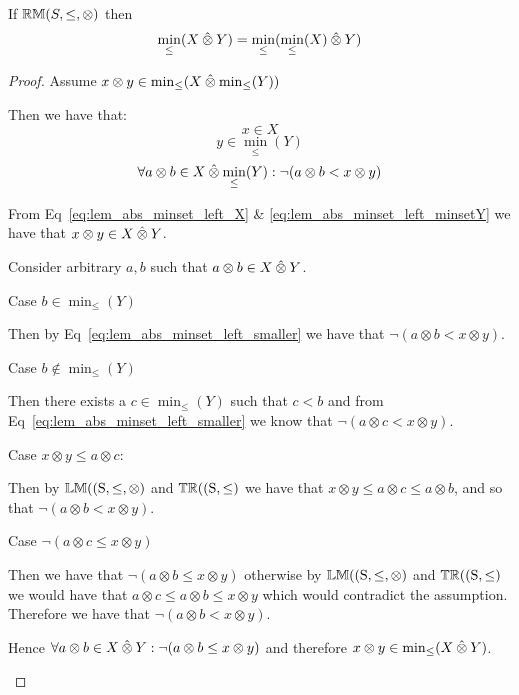 \begin{lemma} \label{lem:minlift_left_absorption}
If ${\mathbb{RM}}(S,\leq,\otimes)$ then
\begin{equation*}
\min_\leq(X \mathbin{\hat{\otimes}} Y) = \min_\leq(\min_\leq(X) \mathbin{\hat{\otimes}} Y)
\end{equation*}
\end{lemma}

\begin{proof}

\vspace{0.5em}
Assume $x \otimes y \in \min_\leq(X \mathbin{\hat{\otimes}} \min_\leq(Y))$

\begin{ind}
Then we have that:
\begin{equation} \label{eq:lem_abs_minset_left_X}
x \in X
\end{equation}
\begin{equation} \label{eq:lem_abs_minset_left_minsetY}
y \in \min_\leq(Y)
\end{equation}
\begin{equation} \label{eq:lem_abs_minset_left_smaller}
\forall a \otimes b \in X \mathbin{\hat{\otimes}} \min_\leq(Y) : \neg (a \otimes b < x \otimes y)
\end{equation}

From Eq~\ref{eq:lem_abs_minset_left_X} \& \ref{eq:lem_abs_minset_left_minsetY} we have that $x \otimes y \in X \mathbin{\hat{\otimes}} Y$.

\vspace{0.5em}

Consider arbitrary $a, b$ such that $a \otimes b \in X \mathbin{\hat{\otimes}} Y$.
\begin{ind}
Case $b \in \min_\leq(Y)$
\begin{ind}
Then by Eq~\ref{eq:lem_abs_minset_left_smaller} we have that $\neg (a \otimes b < x \otimes y)$.
\end{ind}
Case $b \notin \min_\leq(Y)$
\begin{ind}
Then there exists a $c \in \min_\leq(Y)$ such that $c < b$ and from Eq~\ref{eq:lem_abs_minset_left_smaller} we know that $\neg (a \otimes c < x \otimes y)$.

\vspace{0.5em}

Case $x \otimes y \leq a \otimes c$:
\begin{ind}
Then by ${\mathbb{LM}}(\mathrm{(S,\leq,\otimes)}$ and ${\mathbb{TR}}(\mathrm{(S,\leq)}$ we have that $x \otimes y \leq a \otimes c \leq a \otimes b$, and so that $\neg (a \otimes b < x \otimes y)$.
\end{ind}
Case $\neg (a \otimes c \leq x \otimes y)$
\begin{ind}
Then we have that $\neg(a \otimes b \leq x \otimes y)$ otherwise by ${\mathbb{LM}}(\mathrm{(S,\leq,\otimes)}$ and ${\mathbb{TR}}(\mathrm{(S,\leq)}$ we would have that $a \otimes c \leq a \otimes b \leq x \otimes y$ which would contradict the assumption. Therefore we have that $\neg (a \otimes b < x \otimes y)$.
\end{ind}
\end{ind}
\end{ind}
Hence $\forall a \otimes b \in X \mathbin{\hat{\otimes}} Y : \neg (a \otimes b \leq x \otimes y)$ and therefore $x \otimes y \in \min_\leq(X \mathbin{\hat{\otimes}} Y)$.


\end{ind}
\end{proof}
